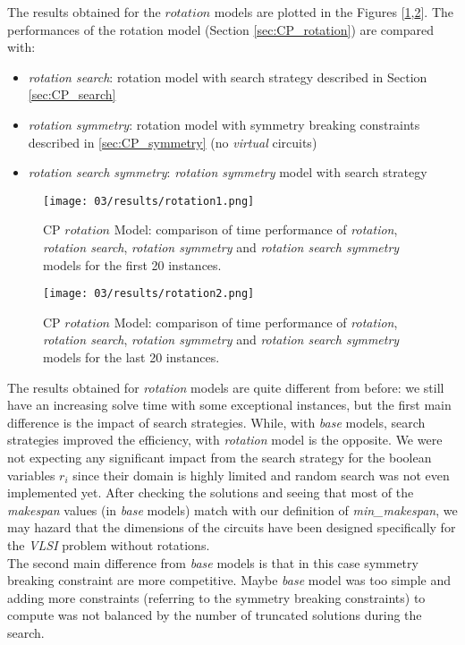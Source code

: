The results obtained for the \(rotation\) models are plotted in the Figures [\ref{fig:CP_results_rotation1},\ref{fig:CP_results_rotation2}].
The performances of the rotation model (Section \ref{sec:CP_rotation}) are compared with:
\begin{itemize}
  \item \textit{rotation search}: rotation model with search strategy described in Section \ref{sec:CP_search}
  \item \textit{rotation symmetry}: rotation model with symmetry breaking constraints described in \ref{sec:CP_symmetry} (no \textit{virtual} circuits)
  \item \textit{rotation search symmetry}: \textit{rotation symmetry} model with search strategy
\end{itemize}

\begin{figure}[H]
  \centering
  \texttt{[image: 03/results/rotation1.png]}
  \caption{
    CP \(rotation\) Model: comparison of time performance of \textit{rotation}, \textit{rotation search}, \textit{rotation symmetry} and \textit{rotation search symmetry} models
    for the first 20 instances.
  }
  \label{fig:CP_results_rotation1}
\end{figure}
\begin{figure}[H]
  \centering
  \texttt{[image: 03/results/rotation2.png]}
  \caption{
    CP \(rotation\) Model: comparison of time performance of \textit{rotation}, \textit{rotation search}, \textit{rotation symmetry} and \textit{rotation search symmetry} models
    for the last 20 instances.
  }
  \label{fig:CP_results_rotation2}
\end{figure}

The results obtained for \textit{rotation} models are quite different from before: we still have an increasing solve 
time with some exceptional instances, but the first main difference is the impact of search strategies. 
While, with \textit{base} models, search strategies improved the efficiency, with \textit{rotation} model is the opposite.
We were not expecting any significant impact from the search strategy for the boolean variables \(r_i\) since their domain 
is highly limited and random search was not even implemented yet.
After checking the solutions and seeing that most of the \textit{makespan} values (in \textit{base} models) match with our 
definition of \textit{min\_makespan}, we may hazard that the dimensions of the circuits have been designed specifically for 
the \textit{VLSI} problem without rotations.\\

The second main difference from \textit{base} models is that in this case symmetry breaking constraint are more competitive. 
Maybe \textit{base} model was too simple and adding more constraints (referring to the symmetry breaking constraints) to 
compute was not balanced by the number of truncated solutions during the search.